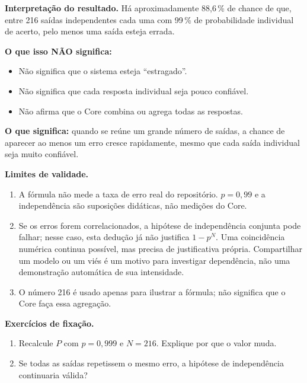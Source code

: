 \begin{descricao}
\textbf{Interpretação do resultado.} Há aproximadamente 88,6\,\% de chance de que, entre 216 saídas independentes cada uma com 99\,\% de probabilidade individual de acerto, pelo menos uma saída esteja errada.

\textbf{O que isso NÃO significa:}
\begin{itemize}[leftmargin=1.3em,itemsep=1pt]
  \item Não significa que o sistema esteja “estragado”.
  \item Não significa que cada resposta individual seja pouco confiável.
  \item Não afirma que o Core combina ou agrega todas as respostas.
\end{itemize}

\textbf{O que significa:} quando se reúne um grande número de saídas, a chance de aparecer ao menos um erro cresce rapidamente, mesmo que cada saída individual seja muito confiável.
\end{descricao}

\begin{aviso}
\textbf{Limites de validade.}
\begin{enumerate}[leftmargin=1.3em,itemsep=1pt]
  \item A fórmula não mede a taxa de erro real do repositório. $p = 0{,}99$ e a independência são suposições didáticas, não medições do Core.
  \item Se os erros forem correlacionados, a hipótese de independência conjunta pode falhar; nesse caso, esta dedução já não justifica $1-p^N$. Uma coincidência numérica continua possível, mas precisa de justificativa própria. Compartilhar um modelo ou um viés é um motivo para investigar dependência, não uma demonstração automática de sua intensidade.
  \item O número 216 é usado apenas para ilustrar a fórmula; não significa que o Core faça essa agregação.
\end{enumerate}
\end{aviso}

\begin{resultado}
\textbf{Exercícios de fixação.}
\begin{enumerate}[leftmargin=1.3em,itemsep=2pt]
  \item Recalcule $P$ com $p = 0{,}999$ e $N = 216$. Explique por que o valor muda.
  \item Se todas as saídas repetissem o mesmo erro, a hipótese de independência continuaria válida?
\end{enumerate}
\end{resultado}

